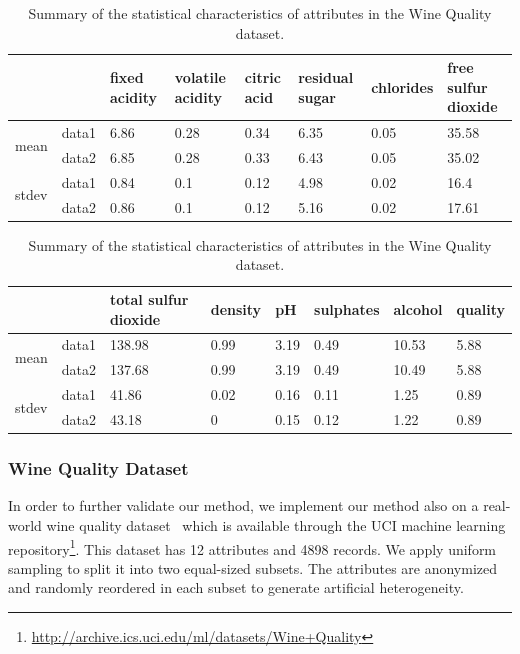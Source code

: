 \begin{table}[tbh]
\begin{center}
\begin{tabular}{l|l|l|l|l|l|l|l}
\hline
\multicolumn{2}{c|}{}		&	fixed acidity	&	volatile acidity	&	citric acid	&	residual sugar	&	chlorides	&	free sulfur dioxide	\\
\hline
\multirow{2}{*}{mean}	&	data1	&	6.86	&	0.28	&	0.34	&	6.35	&	0.05	&	35.58	\\
	&	data2	&	6.85	&	0.28	&	0.33	&	6.43	&	0.05	&	35.02	\\
\hline
\multirow{2}{*}{stdev}	&	data1	&	0.84	&	0.1	&	0.12	&	4.98	&	0.02	&	16.4	\\
	&	data2	&	0.86	&	0.1	&	0.12	&	5.16	&	0.02	&	17.61	\\

\hline
\end{tabular}
\begin{tabular}{l|l|l|l|l|l|l|l}
\hline
\multicolumn{2}{c|}{}		&	total sulfur dioxide	&	density	&	pH	&	sulphates	&	alcohol	&	quality	\\
\hline
\multirow{2}{*}{mean}	&	data1	&	138.98	&	0.99	&	3.19	&	0.49	&	10.53	&	5.88	\\
	&	data2	&	137.68	&	0.99	&	3.19	&	0.49	&	10.49	&	5.88	\\
\hline
\multirow{2}{*}{stdev}	&	data1	&	41.86	&	0.02	&	0.16	&	0.11	&	1.25	&	0.89	\\
	&	data2	&	43.18	&	0	&	0.15	&	0.12	&	1.22	&	0.89	\\

\hline
\end{tabular}
\end{center}
\caption{\label{tbl:wine_stat} Summary of the statistical characteristics of attributes in the Wine Quality dataset.}
\end{table}

\subsubsection{Wine Quality Dataset}
In order to further validate our method, we implement our method also on a real-world wine quality dataset~\cite{CorCer09} which is available through the UCI machine learning repository\footnote[1]{\url{http://archive.ics.uci.edu/ml/datasets/Wine+Quality}}. This dataset has 12 attributes and 4898 records. We apply uniform sampling to split it into two equal-sized subsets. The attributes are anonymized and randomly reordered in each subset to generate artificial heterogeneity.

